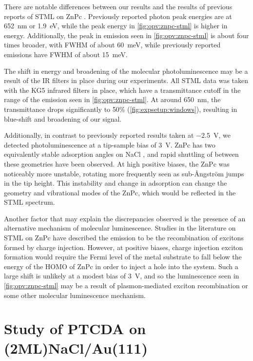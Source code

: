 There are notable differences between our results and the results of previous reports of \ac{STML} on ZnPc \citep{Zhang2016, Doppagne2017, Zhang2017, Doppagne2018}. Previously reported photon peak energies are at \SI{652}{nm} or \SI{1.9}{eV}, while the peak energy in \autoref{fig:opv:znpc-stml} is higher in energy. Additionally, the peak in emission seen in \autoref{fig:opv:znpc-stml} is about four times broader, with \ac{FWHM} of about \SI{60}{meV}, while previously reported emissions have \ac{FWHM} of about \SI{15}{meV}.

The shift in energy and broadening of the molecular photoluminescence may be a result of the IR filters in place during our experiments. All \ac{STML} data was taken with the KG5 infrared filters in place, which have a transmittance cutoff in the range of the emission seen in \autoref{fig:opv:znpc-stml}. At around \SI{650}{nm}, the transmittance drops significantly to 50\% (\autoref{fig:expsetup:windows}), resulting in blue-shift and broadening of our signal. 

Additionally, in contrast to previously reported results taken at \SI{-2.5}{V}, we detected photoluminescence at a tip-sample bias of \SI{3}{V}. ZnPc has two equivalently stable adsorption angles on NaCl \citep{Miwa2016}, and rapid shuttling of between these geometries have been observed. At high positive biases, the ZnPc was noticeably more unstable, rotating more frequently seen as sub-\AA ngstr\"om jumps in the tip height. This instability and change in adsorption can change the geometry and vibrational modes of the ZnPc, which would be reflected in the \ac{STML} spectrum. 

Another factor that may explain the discrepancies observed is the presence of an alternative mechanism of molecular luminescence. Studies in the literature on \ac{STML} on ZnPc have described the emission to be the recombination of excitons formed by charge injection. However, at positive biases, charge injection exciton formation would require the Fermi level of the metal substrate to fall below the energy of the \ac{HOMO} of ZnPc in order to inject a hole into the system. Such a large shift is unlikely at a modest bias of \SI{3}{V}, and so the luminescence seen in \autoref{fig:opv:znpc-stml} may be a result of plasmon-mediated exciton recombination or some other molecular luminescence mechanism.








\section{Study of PTCDA on (2ML)NaCl/Au(111)}

